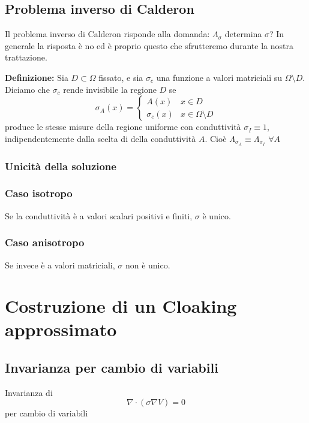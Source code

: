 \documentclass{book}
\begin{document}
\section{Problema inverso di Calderon}
Il problema inverso di Calderon risponde alla domanda: $\Lambda_\sigma$ determina $\sigma$? In generale la risposta è no ed è proprio questo che sfrutteremo durante la nostra trattazione.

\textbf{Definizione:} Sia $D \subset \Omega$ fissato, e sia $\sigma_c$ una funzione a valori matriciali su $\Omega \setminus D$. Diciamo che $\sigma_c$ rende invisibile la regione $D$ se
\begin{equation*}
    \sigma_A(x) = \left\{\begin{array}{ll}
         A(x) & x\in D\\
         \sigma_c(x) & x\in \Omega\setminus D
    \end{array}\right.
\end{equation*}
produce le stesse misure della regione uniforme con conduttività $\sigma_I \equiv 1$, indipendentemente dalla scelta di della conduttività $A$. Cioè $\Lambda_{\sigma_A} \equiv \Lambda_{\sigma_I}$  $\forall A$


\subsection{Unicità della soluzione}

\subsection{Caso isotropo}
Se la conduttività è a valori scalari positivi e finiti, $\sigma$ è unico.
\subsection{Caso anisotropo}
Se invece è a valori matriciali, $\sigma$ non è unico.





\chapter{Costruzione di un Cloaking approssimato}
\section{Invarianza per cambio di variabili}
Invarianza di
\begin{equation}
    \nabla \cdot (\sigma\nabla V) = 0
\end{equation}
per cambio di variabili
\end{document}
